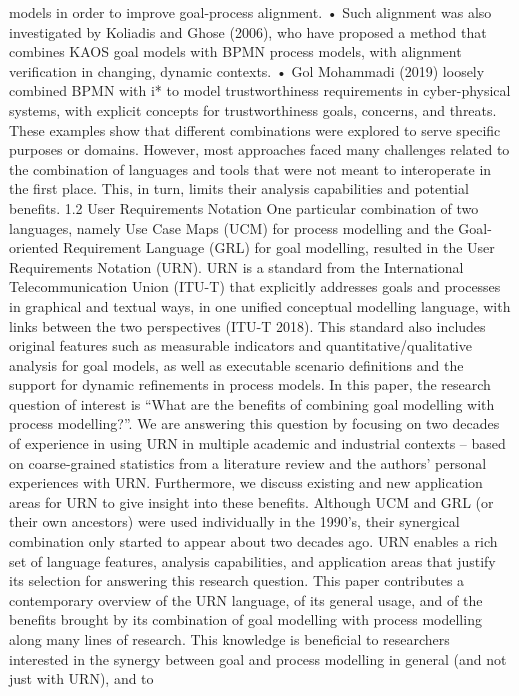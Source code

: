models in order to improve goal-process alignment.
• Such alignment was also investigated by Koliadis and Ghose (2006), who have proposed
a method that combines KAOS goal models
with BPMN process models, with alignment
verification in changing, dynamic contexts.
• Gol Mohammadi (2019) loosely combined
BPMN with i* to model trustworthiness requirements in cyber-physical systems, with explicit
concepts for trustworthiness goals, concerns,
and threats.
These examples show that different combinations were explored to serve specific purposes or
domains. However, most approaches faced many
challenges related to the combination of languages
and tools that were not meant to interoperate in
the first place. This, in turn, limits their analysis
capabilities and potential benefits.
1.2 User Requirements Notation
One particular combination of two languages,
namely Use Case Maps (UCM) for process modelling and the Goal-oriented Requirement Language (GRL) for goal modelling, resulted in the
User Requirements Notation (URN). URN is a
standard from the International Telecommunication Union (ITU-T) that explicitly addresses goals
and processes in graphical and textual ways, in one
unified conceptual modelling language, with links
between the two perspectives (ITU-T 2018). This
standard also includes original features such as
measurable indicators and quantitative/qualitative
analysis for goal models, as well as executable
scenario definitions and the support for dynamic
refinements in process models.
In this paper, the research question of interest is “What are the benefits of combining goal
modelling with process modelling?”. We are answering this question by focusing on two decades
of experience in using URN in multiple academic
and industrial contexts – based on coarse-grained
statistics from a literature review and the authors’
personal experiences with URN. Furthermore, we
discuss existing and new application areas for
URN to give insight into these benefits. Although
UCM and GRL (or their own ancestors) were used
individually in the 1990’s, their synergical combination only started to appear about two decades
ago. URN enables a rich set of language features,
analysis capabilities, and application areas that
justify its selection for answering this research
question.
This paper contributes a contemporary
overview of the URN language, of its general usage, and of the benefits brought by its
combination of goal modelling with process
modelling along many lines of research. This
knowledge is beneficial to researchers interested
in the synergy between goal and process modelling in general (and not just with URN), and to
